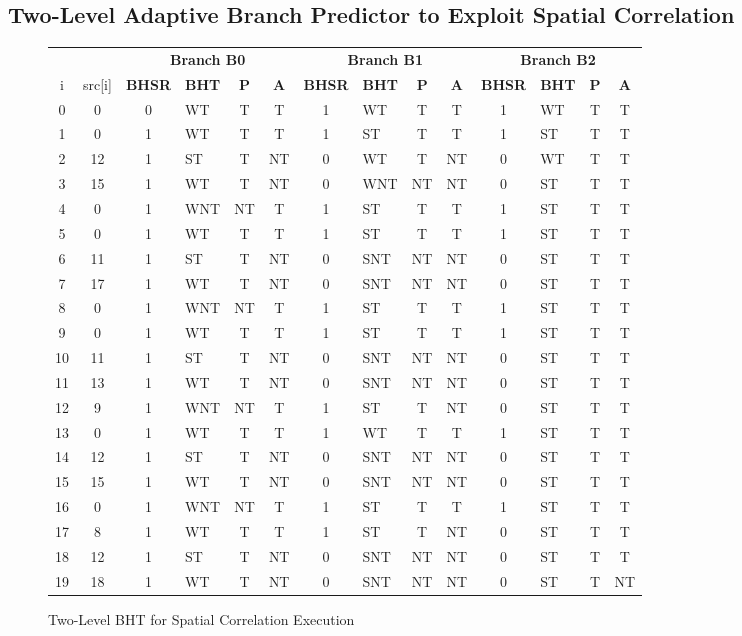 \documentclass[10pt]{article}
\begin{document}
\subsection{Two-Level Adaptive Branch Predictor to Exploit Spatial Correlation}

\begin{figure}[H]
\centering
{\setlength{\tabcolsep}{3pt}
\begin{tabular}{@{\extracolsep{3pt}}ccclccclccclcc@{}}
\hline
& & \multicolumn{4}{c}{\textbf{Branch B0}} & \multicolumn{4}{c}{\textbf{Branch B1}} & \multicolumn{4}{c}{\textbf{Branch B2}}\\
\cline{3-6}
\cline{7-10}
\cline{11-14}
i & src[i] & \textbf{BHSR} & \textbf{BHT} & \textbf{P} & \textbf{A} & \textbf{BHSR} & \textbf{BHT} & \textbf{P} & \textbf{A} & \textbf{BHSR} & \textbf{BHT} & \textbf{P} & \textbf{A} \\ \hline
0 & 0 & 0  & WT& T & T & 1  & WT& T & T & 1  & WT& T & T \\ \hline
1 & 0 & 1  & WT& T & T & 1  & ST& T & T & 1  & ST& T & T \\ \hline
2 & 12& 1  & ST& T & NT& 0  & WT& T & NT& 0  & WT& T & T \\ \hline
3 & 15& 1  & WT& T & NT& 0  &WNT& NT& NT& 0  & ST& T & T \\ \hline
4 & 0 & 1  &WNT& NT& T & 1  & ST& T & T & 1  & ST& T & T \\ \hline
5 & 0 & 1  & WT& T & T & 1  & ST& T & T & 1  & ST& T & T \\ \hline
6 & 11& 1  & ST& T & NT& 0  &SNT& NT& NT& 0  & ST& T & T \\ \hline
7 & 17& 1  & WT& T & NT& 0  &SNT& NT& NT& 0  & ST& T & T \\ \hline
8 & 0 & 1  &WNT& NT& T & 1  & ST& T & T & 1  & ST& T & T \\ \hline
9 & 0 & 1  & WT& T & T & 1  & ST& T & T & 1  & ST& T & T \\ \hline
10& 11& 1  & ST& T & NT& 0  &SNT& NT& NT& 0  & ST& T & T \\ \hline
11& 13& 1  & WT& T & NT& 0  &SNT& NT& NT& 0  & ST& T & T \\ \hline
12& 9 & 1  &WNT& NT& T & 1  & ST& T & NT& 0  & ST& T & T \\ \hline
13& 0 & 1  & WT& T & T & 1  & WT& T & T & 1  & ST& T & T \\ \hline
14& 12& 1  & ST& T & NT& 0  &SNT& NT& NT& 0  & ST& T & T \\ \hline
15& 15& 1  & WT& T & NT& 0  &SNT& NT& NT& 0  & ST& T & T \\ \hline
16& 0 & 1  &WNT& NT& T & 1  & ST& T & T & 1  & ST& T & T \\ \hline
17& 8 & 1  & WT& T & T & 1  & ST& T & NT& 0  & ST& T & T \\ \hline
18& 12& 1  & ST& T & NT& 0  &SNT& NT& NT& 0  & ST& T & T \\ \hline
19& 18& 1  & WT& T & NT& 0  &SNT& NT& NT& 0  & ST& T & NT\\ \hline
\end{tabular}
}
\caption{Two-Level BHT for Spatial Correlation Execution}
\end{figure}
\end{document}

